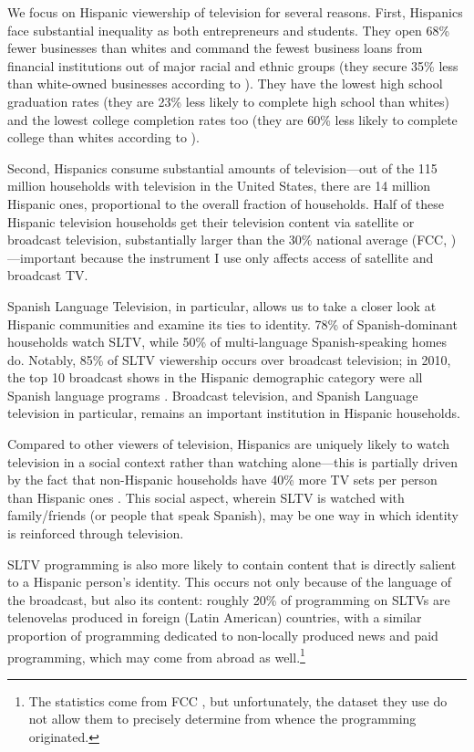 \documentclass[11pt]{article}
\begin{document}
We focus on Hispanic viewership of television for several reasons. First, Hispanics face substantial inequality as both entrepreneurs and students. They open 68\% fewer businesses than whites and command the fewest business loans from financial institutions out of major racial and ethnic groups (they secure 35\% less than white-owned businesses according to \cite{orozco_state_2017}). They have the lowest high school graduation rates (they are 23\% less likely to complete high school than whites) and the lowest college completion rates too (they are 60\% less likely to complete college than whites according to \cite{tienda_hispanicity_2009}).  

Second, Hispanics consume substantial amounts of television---out of the 115 million households with television in the United States, there are 14 million Hispanic ones, proportional to the overall fraction of households. Half of these Hispanic television households get their television content via satellite or broadcast television, substantially larger than the 30\% national average (FCC\cite{noauthor_hispanic_2016}, \cite{de_la_merced_att_2014})---important because the instrument I use only affects access of satellite and broadcast TV.

Spanish Language Television, in particular, allows us to take a closer look at Hispanic communities and examine its ties to identity. 78\% of Spanish-dominant households watch SLTV, while 50\% of multi-language Spanish-speaking homes do. Notably, 85\% of SLTV viewership occurs over broadcast television; in 2010, the top 10 broadcast shows in the Hispanic demographic category were all Spanish language programs \citep{pardo_three_2011}. Broadcast television, and Spanish Language television in particular, remains an important institution in Hispanic households. 
 
 Compared to other viewers of television, Hispanics are uniquely likely to watch television in a social context rather than watching alone---this is partially driven by the fact that non-Hispanic households have 40\% more TV sets per person than Hispanic ones \citep{coghill_tuning_2018}. This social aspect, wherein SLTV is watched with family/friends (or people that speak Spanish), may be one way in which identity is reinforced through television. 

SLTV programming is also more likely to contain content that is directly salient to a Hispanic person's identity. This occurs not only because of the language of the broadcast, but also its content: roughly 20\% of programming on SLTVs are telenovelas produced in foreign (Latin American) countries, with a similar proportion of programming dedicated to non-locally produced news and paid programming, which may come from abroad as well.\footnote{ The statistics come from FCC \cite{noauthor_hispanic_2016}, but unfortunately, the dataset they use do not allow them to precisely determine from whence the programming originated. }
\end{document}
